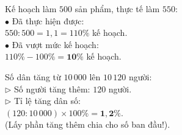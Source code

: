 \documentclass[14pt,a4paper,oneside]{extbook}
\begin{document}
\noindent
\begin{minipage}[t]{0.52\textwidth}
  \begin{tcolorbox}[
    enhanced,
    title={\footnotesize\bfseries\color{white}\faBriefcase\ 2. Tính tỉ lệ hoàn thành kế hoạch},
    colback=teal!2!white,
    colframe=teal!75!black,
    arc=2.5mm, boxrule=0.8pt, top=1.8mm, bottom=1.8mm, left=2.2mm, right=2.2mm
  ]
    \footnotesize
    Kế hoạch làm $500$ sản phẩm, thực tế làm $550$:\\
    $\bullet$ Đã thực hiện được:\\
    \quad $550 : 500 = 1,1 = 110\%$ kế hoạch.\\
    $\bullet$ Đã vượt mức kế hoạch:\\
    \quad $110\% - 100\% = \mathbf{10\%}$ kế hoạch.
  \end{tcolorbox}
\end{minipage}%
\hfill
\begin{minipage}[t]{0.46\textwidth}
  \begin{tcolorbox}[
    enhanced,
    title={\footnotesize\bfseries\color{white}\faPercent\ 3. Tỉ lệ tăng/giảm phần trăm},
    colback=purple!2!white,
    colframe=purple!70!black,
    arc=2.5mm, boxrule=0.8pt, top=1.8mm, bottom=1.8mm, left=2mm, right=2mm
  ]
    \footnotesize
    Số dân tăng từ $10\,000$ lên $10\,120$ người:\\
    $\triangleright$ Số người tăng thêm: $120$ người.\\
    $\triangleright$ Tỉ lệ tăng dân số:\\
    \quad $(120 : 10\,000) \times 100\% = \mathbf{1,2\%}$.\\
    (Lấy phần tăng thêm chia cho số ban đầu!).
  \end{tcolorbox}
\end{minipage}

\vspace{3mm}
\end{document}
